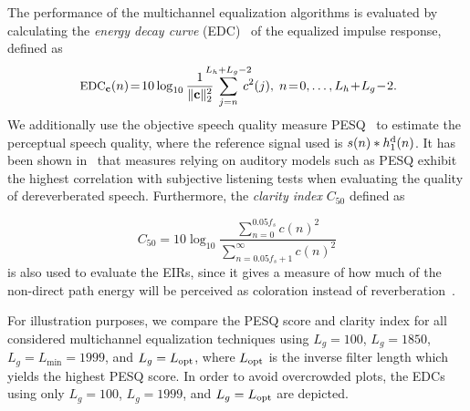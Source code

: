 \documentclass{article}
\begin{document}
The performance of the multichannel equalization algorithms is evaluated by calculating the \emph{energy decay curve} (EDC)~\cite{Naylor_Derev_book} of the equalized impulse response, defined as
\begin{equation}
\small
\hspace{-0.01cm} \hbox{EDC}_{\mathbf{c}}(n)\! = \!10 \log_{10}\frac{1}{\|\mathbf{c}\|_2^2}\!\!\!\!\!\sum_{j=n}^{L_h+L_g-2}\!\!\!\!\!c^2(j), \; n \!=\! 0,  \ldots,  L_h\!+\!L_g\!-\!2. \hspace{-0.06cm}
\end{equation}
We additionally use the objective speech quality measure PESQ~\cite{PESQ} to estimate the perceptual speech quality, where the reference signal used is $s(n) \ast h_1^{\rm d}(n)$. 
It has been shown in~\cite{Goetze_AES_2010} that measures relying on auditory models such as PESQ exhibit the highest correlation with subjective listening tests when evaluating the quality of dereverberated speech.
Furthermore, the \emph{clarity index} $C_{50}$ defined as

\begin{equation}
C_{50} = 10 \log_{10} \frac{\sum_{n=0}^{0.05f_s}c(n)^2}{\sum_{n = 0.05f_s+1}^{\infty}c(n)^2}
\end{equation}
is also used to evaluate the EIRs, since it gives a measure of how much of the non-direct path energy will be perceived as coloration instead of reverberation~\cite{Naylor_Derev_book}.

For illustration purposes, we compare the PESQ score and clarity index for all considered multichannel equalization techniques using $L_g = 100$, $L_g = 1850$, $L_g = L_{\min} = 1999$, and $L_g = L_{\rm opt}$,  where $L_{\rm opt}$ is the inverse filter length which yields the highest PESQ score. In order to avoid overcrowded plots, the EDCs using only $L_g = 100$, $L_g = 1999$, and $L_g = L_{\rm opt}$ are depicted.
\end{document}
